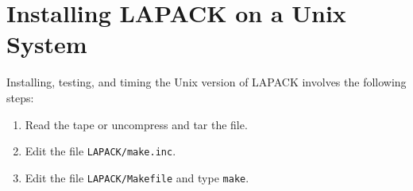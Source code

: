 \section{Installing LAPACK on a Unix System}\label{installation}

Installing, testing, and timing the Unix version of LAPACK
involves the following steps: 
\begin{enumerate}
\item Read the tape or uncompress and tar the file.

\item Edit the file {\tt LAPACK/make.inc}.
 
\item Edit the file {\tt LAPACK/Makefile} and type {\tt make}.

%
%
%
%

\end{enumerate}
